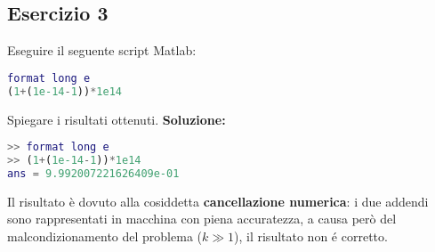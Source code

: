 \subsection{Esercizio 3}
Eseguire il seguente script Matlab:
\begin{lstlisting}[language=Matlab]
format long e
(1+(1e-14-1))*1e14
\end{lstlisting}
Spiegare i risultati ottenuti.
\newline \textbf{Soluzione:}
\begin{lstlisting}[language=Matlab]
>> format long e
>> (1+(1e-14-1))*1e14
ans = 9.992007221626409e-01
\end{lstlisting}
Il risultato è dovuto alla cosiddetta \textbf{cancellazione numerica}:
i due addendi sono rappresentati in macchina con piena accuratezza, a causa però del
malcondizionamento del problema ($k \gg 1$), il risultato non é corretto.
